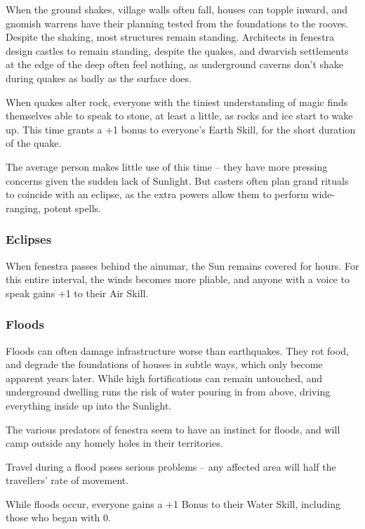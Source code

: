 \begin{multicols}{2}
When the ground shakes, \gls{village} walls often fall, houses can topple inward, and gnomish warrens have their planning tested from the foundations to the rooves.
Despite the shaking, most structures remain standing.
Architects in \gls{fenestra} design castles to remain standing, despite the quakes, and dwarvish settlements at the edge of the \gls{deep} often feel nothing, as underground caverns don't shake during quakes as badly as the surface does.

When quakes alter rock, everyone with the tiniest understanding of magic finds themselves able to speak to stone, at least a little, as rocks and ice start to wake up.
This time grants a +1 bonus to everyone's Earth Skill, for the short duration of the quake.

The average person makes little use of this time -- they have more pressing concerns given the sudden lack of Sunlight.
But casters often plan grand rituals to coincide with an eclipse, as the extra powers allow them to perform wide-ranging, potent spells.

\subsubsection{Eclipses}

When \gls{fenestra} passes behind the \gls{ainumar}, the Sun remains covered for hours.
For this entire \gls{interval}, the winds becomes more pliable, and anyone with a voice to speak gains +1 to their Air Skill.

\subsubsection{Floods}

Floods can often damage infrastructure worse than earthquakes.
They rot food, and degrade the foundations of houses in subtle ways, which only become apparent years later.
While high fortifications can remain untouched, and underground dwelling runs the risk of water pouring in from above, driving everything inside up into the Sunlight.

The various predators of \gls{fenestra} seem to have an instinct for floods, and will camp outside any homely holes in their territories.

Travel during a flood poses serious problems -- any affected area will half the travellers' rate of movement.

While floods occur, everyone gains a +1 Bonus to their Water Skill, including those who began with 0.


\end{multicols}
